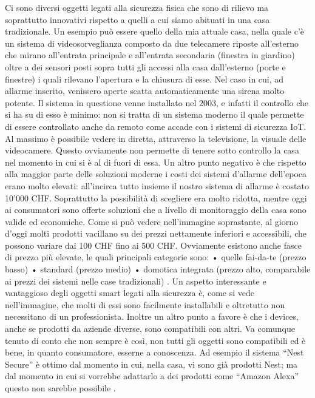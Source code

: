 Ci sono diversi oggetti legati alla sicurezza fisica che sono di rilievo ma soprattutto innovativi rispetto a quelli a cui siamo abituati in una casa tradizionale. Un esempio può essere quello della mia attuale casa, nella quale c’è un sistema di videosorveglianza composto da due telecamere riposte all’esterno che mirano all’entrata principale e all’entrata secondaria (finestra in giardino) oltre a dei sensori posti sopra tutti gli accessi alla casa dall’esterno (porte e finestre) i quali rilevano l’apertura e la chiusura di esse. Nel caso in cui, ad allarme inserito, venissero aperte scatta automaticamente una sirena molto potente. Il sistema in questione venne installato nel 2003, e infatti il controllo che si ha su di esso è minimo: non si tratta di un sistema moderno il quale permette di essere controllato anche da remoto come accade con i sistemi di sicurezza IoT. Al massimo è possibile vedere in diretta, attraverso la televisione, la visuale delle videocamere. Questo ovviamente non permette di tenere sotto controllo la casa nel momento in cui si è al di fuori di essa. Un altro punto negativo è che rispetto alla maggior parte delle soluzioni moderne i costi dei sistemi d’allarme dell’epoca erano molto elevati: all’incirca tutto insieme il nostro sistema di allarme è costato 10'000 CHF. Soprattutto la possibilità di scegliere era molto ridotta, mentre oggi ai consumatori sono offerte soluzioni che a livello di monitoraggio della casa sono valide ed economiche.
Come si può vedere nell’immagine soprastante, al giorno d’oggi molti prodotti vacillano su dei prezzi nettamente inferiori e accessibili, che possono variare dai 100 CHF fino ai 500 CHF. Ovviamente esistono anche fasce di prezzo più elevate, le quali principali categorie sono:
•	quelle fai-da-te (prezzo basso)
•	standard (prezzo medio)
•	domotica integrata (prezzo alto, comparabile ai prezzi dei sistemi nelle case tradizionali) . 
Un aspetto interessante e vantaggioso degli oggetti smart legati alla sicurezza è, come si vede nell’immagine, che molti di essi sono facilmente installabili e oltretutto non necessitano di un professionista. Inoltre un altro punto a favore è che i devices, anche se prodotti da aziende diverse, sono compatibili con altri. Va comunque tenuto di conto che non sempre è così, non tutti gli oggetti sono compatibili ed è bene, in quanto consumatore, esserne a conoscenza. Ad esempio il sistema “Nest Secure” è ottimo dal momento in cui, nella casa, vi sono già prodotti Nest; ma dal momento in cui si vorrebbe adattarlo a dei prodotti come “Amazon Alexa” questo non sarebbe possibile .
